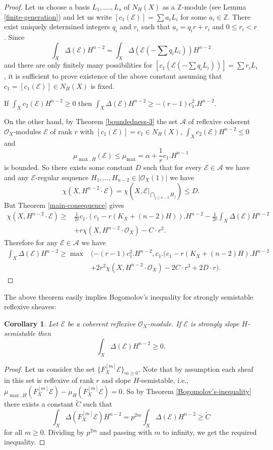 \documentclass[twoside, 11pt]{article}
\theoremstyle{plain}
\newtheorem{Corollary}[Thm]{\sc Corollary}
\theoremstyle{definition}
\theoremstyle{remark}
\newcommand{\ZZ}{{\mathbb Z}}
\newcommand{\cA}{{\mathcal A}}
\newcommand{\cE}{{\mathcal E}}
\newcommand{\cO}{{\mathcal O}}
\begin{document}
\begin{proof}
Let us choose a basis $L_1,....,L_s$ of $N_H (X)$ as a $\ZZ$-module (see Lemma \ref{finite-generation})
and let us write $[c_1 (\cE)]= \sum a_i L_i$ for some $a_i\in \ZZ$. There exist  uniquely determined integers $q_i$
and $r_i$ such that $a_i=q_i r+r_i$ and $0\le r_i <r$.
Since 
$$\int _X \Delta (\cE) H^{n-2}= \int _X \Delta (\cE (-\sum q_i L_i)) H^{n-2}$$
and there are only finitely many possibilities for  $[c_1 (\cE (-\sum q_i L_i))]= \sum r_i L_i$, it is sufficient to prove existence of the above constant assuming that $c_1=[c_1(\cE)]\in N_H (X)$ is fixed.

If $\int _X c_2 (\cE) H^{n-2}\ge 0$ then  $\int _X \Delta (\cE) H^{n-2}\ge - (r-1)c_1^2.H^{n-2}$.

On the other hand, by Theorem \ref{boundedness-3}  the set $\cA$ of reflexive coherent $\cO_X$-modules $\cE$ of rank $r$ with $[c_1(\cE)]=c_1\in N_H(X)$, $\int _X c_2 (\cE) H^{n-2}\le 0$  and $$\mu _{\max ,H } (\cE)\le \mu _{\max}= \alpha+\frac{1}{r}c_1.H^{n-1}$$ is bounded. So there exists some constant $D$ such that for every $\cE\in \cA$ we have
and any $\cE$-regular sequence $H_1,..., H_{n-2}\in |\cO_X (1)|$ we have
$$\chi (X, H^{n-2}\cdot \cE)=\chi (X, \cE |_{\bigcap _{j\le n-2} H_j })\le D.$$
But Theorem \ref{main-consequence} gives
\begin{align*}
\chi (X, H^{n-2} \cdot \cE) \ge &\frac{1}{2r}   c_1.(c_1-r(K_X+(n-2)H)). H^{n-2} 
 -\frac{1}{2r}\int _X \Delta (\cE)H^{n-2}   \\
 &  +r\chi (X, H^{n-2} \cdot \cO_X) - C\cdot r^2.
    \end{align*}
Therefore for any $\cE\in \cA$ we have
\begin{align*}
\int _X \Delta (\cE) H^{n-2}\ge \max &(- (r-1)c_1^2.H^{n-2} ,c_1 . (c_1 -r(K_X+(n-2)H).H^{n-2}\\
&+ 2r^2\chi (X, H^{n-2} \cdot \cO_X )-2C\cdot r^3 +2D\cdot r ).
\end{align*}
\end{proof}

The above theorem easily implies Bogomolov's inequality for strongly semistable reflexive sheaves:

\begin{Corollary}\label{Bogomolov-strongly-ss}
Let $\cE$ be a coherent reflexive $\cO_X$-module. If $\cE$ is strongly slope $H$-semistable
then 
$$\int _X \Delta (\cE)H^{n-2}\ge 0.$$
\end{Corollary}

\begin{proof}
Let us consider the set $\{ F_X^{[m]}\cE \} _{m\ge 0}$. Note that by assumption  each sheaf in this set is
reflexive of rank $r$ and slope $H$-semistable, i.e., $\mu _{\max ,H } (F_X^{[m]}\cE)-\mu _H (F_X^{[m]}\cE)=0$.
So by Theorem \ref{Bogomolov's-inequality} there exists a constant $\tilde C$ such that
$$\int _X \Delta (F_X^{[m]}\cE) H^{n-2}  =p^{2m} \int _X \Delta (\cE) H^{n-2}\ge \tilde C$$
for all $m\ge 0$. Dividing by $p^{2m}$ and passing with $m$ to infinity, we get the required inequality.
\end{proof}
\end{document}
